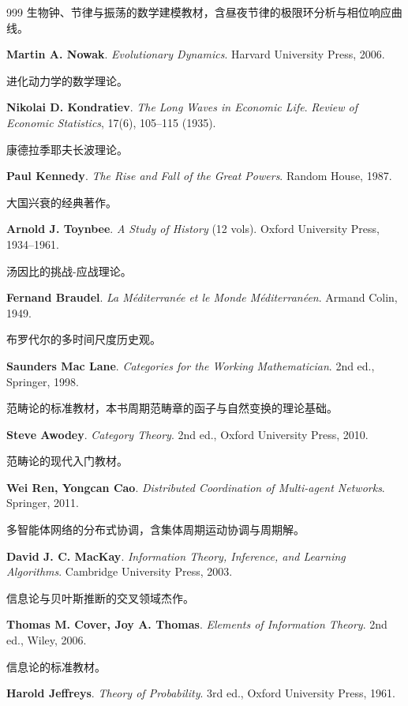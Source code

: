 \begin{thebibliography}{999}
生物钟、节律与振荡的数学建模教材，含昼夜节律的极限环分析与相位响应曲线。

 \textbf{Martin A. Nowak}. \textit{Evolutionary Dynamics}. Harvard University Press, 2006.

进化动力学的数学理论。

 \textbf{Nikolai D. Kondratiev}. \textit{The Long Waves in Economic Life}. \textit{Review of Economic Statistics}, 17(6), 105--115 (1935).

康德拉季耶夫长波理论。

 \textbf{Paul Kennedy}. \textit{The Rise and Fall of the Great Powers}. Random House, 1987.

大国兴衰的经典著作。

 \textbf{Arnold J. Toynbee}. \textit{A Study of History} (12 vols). Oxford University Press, 1934--1961.

汤因比的挑战-应战理论。

 \textbf{Fernand Braudel}. \textit{La M\'editerran\'ee et le Monde M\'editerran\'een}. Armand Colin, 1949.

布罗代尔的多时间尺度历史观。

 \textbf{Saunders Mac Lane}. \textit{Categories for the Working Mathematician}. 2nd ed., Springer, 1998.

范畴论的标准教材，本书周期范畴章的函子与自然变换的理论基础。

 \textbf{Steve Awodey}. \textit{Category Theory}. 2nd ed., Oxford University Press, 2010.

范畴论的现代入门教材。

 \textbf{Wei Ren, Yongcan Cao}. \textit{Distributed Coordination of Multi-agent Networks}. Springer, 2011.

多智能体网络的分布式协调，含集体周期运动协调与周期解。

 \textbf{David J. C. MacKay}. \textit{Information Theory, Inference, and Learning Algorithms}. Cambridge University Press, 2003.

信息论与贝叶斯推断的交叉领域杰作。

 \textbf{Thomas M. Cover, Joy A. Thomas}. \textit{Elements of Information Theory}. 2nd ed., Wiley, 2006.

信息论的标准教材。

 \textbf{Harold Jeffreys}. \textit{Theory of Probability}. 3rd ed., Oxford University Press, 1961.


\end{thebibliography}
